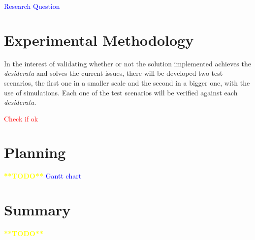 \textcolor{blue}{Research Question}

\section{Experimental Methodology}\label{sec:exp_meth}

In the interest of validating whether or not the solution implemented achieves the \emph{desiderata} and solves the current issues, there will be developed two test scenarios, the first one in a smaller scale and the second in a bigger one, with the use of simulations. Each one of the test scenarios will be verified against each \emph{desiderata}. 

\textcolor{red}{Check if ok}

\section{Planning}\label{sec:planning}

\textcolor{yellow}{\textbf{**TODO**}}
\textcolor{blue}{Gantt chart}

\section{Summary}\label{sec:stat_summary}

\textcolor{yellow}{\textbf{**TODO**}}
